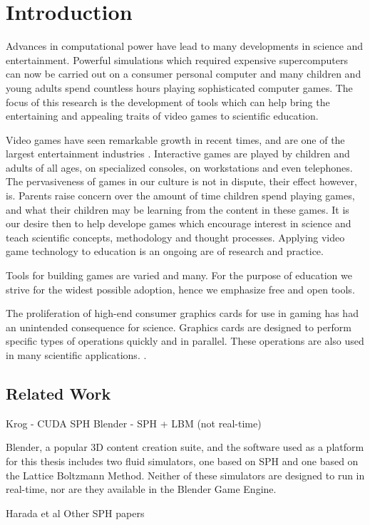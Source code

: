 \chapter{Introduction}

Advances in computational power have lead to many developments in science and
entertainment. Powerful simulations which required expensive supercomputers can
now be carried out on a consumer personal computer and many children and young
adults spend countless hours playing sophisticated computer games. The focus of
this research is the development of tools which can help bring the entertaining
and appealing traits of video games to scientific education.


Video games have seen remarkable growth in recent times, and are one of the
largest entertainment industries \cite{needed}. Interactive games are played by
children and adults of all ages, on specialized consoles, on workstations and
even telephones. The pervasiveness of games in our culture is not in dispute,
their effect however, is. Parents raise concern over the amount of time
children spend playing games, and what their children may be learning from the
content in these games. It is our desire then to help develope games which
encourage interest in science and teach scientific concepts, methodology and
thought processes. Applying video game technology to education is an ongoing
are of research and practice\cite{needed}. 


Tools for building games are varied and many. For the purpose of education we
strive for the widest possible adoption, hence we emphasize free and open
tools. 


The proliferation of high-end consumer graphics cards for use in gaming has had
an unintended consequence for science. Graphics cards are designed to perform
specific types of operations quickly and in parallel. These operations are also
used in many scientific applications.  .\cite{OpenCL}


\section{Related Work}

Krog - CUDA SPH
Blender - SPH + LBM (not real-time)

Blender, a popular 3D content creation suite, and the software used as a
platform for this thesis includes two fluid simulators, one based on SPH\cite{blenderSPH} and
one based on the Lattice Boltzmann Method\cite{Nils}. Neither of these simulators are
designed to run in real-time, nor are they available in the Blender Game
Engine. 


Harada et al
Other SPH papers
